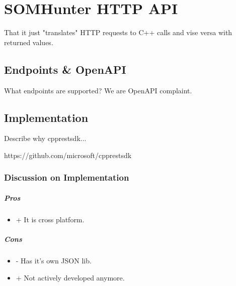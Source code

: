 \chapter{SOMHunter HTTP API}
\label{comp-http-api}
That it just "translates" HTTP requests to C++ calls and vise versa with returned values.

\section{Endpoints \& OpenAPI}
What endpoints are supported? We are OpenAPI complaint.

\section{Implementation}
Describe why cpprestsdk...

https://github.com/microsoft/cpprestsdk

\subsection{Discussion on Implementation}

\paragraph{Pros}
\begin{itemize}
	\item + It is cross platform.
\end{itemize}

\paragraph{Cons}
\begin{itemize}
	\item - Has it's own JSON lib.
	\item + Not actively developed anymore.
\end{itemize}

